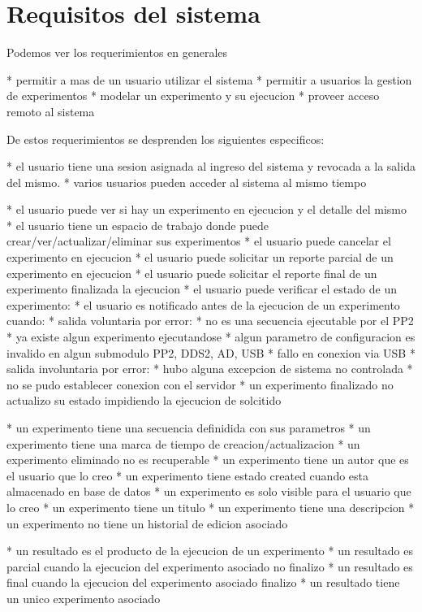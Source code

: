 \section{Requisitos del sistema}

Podemos ver los requerimientos en generales


* permitir a mas de un usuario utilizar el sistema
* permitir a usuarios la gestion de experimentos
* modelar un experimento y su ejecucion
* proveer acceso remoto al sistema

De estos requerimientos se desprenden los siguientes especificos:

* el usuario tiene una sesion asignada al ingreso del sistema y revocada a la salida del mismo.
* varios usuarios pueden acceder al sistema al mismo tiempo


* el usuario puede ver si hay un experimento en ejecucion y el detalle del mismo
* el usuario tiene un espacio de trabajo donde puede crear/ver/actualizar/eliminar sus experimentos
* el usuario puede cancelar el experimento en ejecucion
* el usuario puede solicitar un reporte parcial de un experimento en ejecucion
* el usuario puede solicitar el reporte final de un experimento finalizada la ejecucion
* el usuario puede verificar el estado de un experimento:
* el usuario es notificado antes de la ejecucion de un experimento cuando:
    * salida voluntaria por error:
        * no es una secuencia ejecutable por el PP2
        * ya existe algun experimento ejecutandose
        * algun parametro de configuracion es invalido en algun submodulo PP2, DDS2, AD, USB
        * fallo en conexion via USB
    * salida involuntaria por error:
        * hubo alguna excepcion de sistema no controlada
        * no se pudo establecer conexion con el servidor
        * un experimento finalizado no actualizo su estado impidiendo la ejecucion de solcitido

* un experimento tiene una secuencia definidida con sus parametros
* un experimento tiene una marca de tiempo de creacion/actualizacion
* un experimento eliminado no es recuperable
* un experimento tiene un autor que es el usuario que lo creo
* un experimento tiene estado created cuando esta almacenado en base de datos
* un experimento es solo visible para el usuario que lo creo
* un experimento tiene un titulo
* un experimento tiene una descripcion
* un experimento no tiene un historial de edicion asociado

* un resultado es el producto de la ejecucion de un experimento
* un resultado es parcial cuando la ejecucion del experimento asociado no finalizo
* un resultado es final cuando la ejecucion del experimento asociado finalizo
* un resultado tiene un unico experimento asociado

